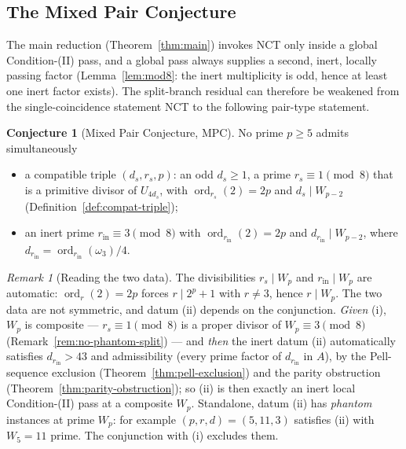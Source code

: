 \documentclass[11pt]{amsart}
\theoremstyle{plain}
\theoremstyle{definition}
\newtheorem{conjecture}[theorem]{Conjecture}
\theoremstyle{remark}
\newtheorem{remark}[theorem]{Remark}
\numberwithin{equation}{section}
\newcommand{\ord}{\operatorname{ord}}
\begin{document}
\subsection{The Mixed Pair Conjecture}\label{sec:mpc}

The main reduction (Theorem~\ref{thm:main}) invokes NCT only inside a global Condition-(II) pass, and a global pass always supplies a second, inert, locally passing factor (Lemma~\ref{lem:mod8}: the inert multiplicity is odd, hence at least one inert factor exists). The split-branch residual can therefore be weakened from the single-coincidence statement NCT to the following pair-type statement.

\begin{conjecture}[Mixed Pair Conjecture, MPC]\label{conj:mpc}
No prime $p \geq 5$ admits simultaneously
\begin{itemize}
\item[(i)] a compatible triple $(d_s, r_s, p)$: an odd $d_s \geq 1$, a prime $r_s \equiv 1 \pmod 8$ that is a primitive divisor of $U_{4 d_s}$, with $\ord_{r_s}(2) = 2p$ and $d_s \mid W_{p-2}$ (Definition~\ref{def:compat-triple});
\item[(ii)] an inert prime $r_{\mathrm{in}} \equiv 3 \pmod 8$ with $\ord_{r_{\mathrm{in}}}(2) = 2p$ and $d_{r_{\mathrm{in}}} \mid W_{p-2}$, where $d_{r_{\mathrm{in}}} = \ord_{r_{\mathrm{in}}}(\omega_3)/4$.
\end{itemize}
\end{conjecture}

\begin{remark}[Reading the two data]\label{rem:mpc-data}
The divisibilities $r_s \mid W_p$ and $r_{\mathrm{in}} \mid W_p$ are automatic: $\ord_r(2) = 2p$ forces $r \mid 2^p + 1$ with $r \neq 3$, hence $r \mid W_p$. The two data are not symmetric, and datum (ii) depends on the conjunction. \emph{Given} (i), $W_p$ is composite --- $r_s \equiv 1 \pmod 8$ is a proper divisor of $W_p \equiv 3 \pmod 8$ (Remark~\ref{rem:no-phantom-split}) --- and \emph{then} the inert datum (ii) automatically satisfies $d_{r_{\mathrm{in}}} > 43$ and admissibility (every prime factor of $d_{r_{\mathrm{in}}}$ in $A$), by the Pell-sequence exclusion (Theorem~\ref{thm:pell-exclusion}) and the parity obstruction (Theorem~\ref{thm:parity-obstruction}); so (ii) is then exactly an inert local Condition-(II) pass at a composite $W_p$. Standalone, datum (ii) has \emph{phantom} instances at prime $W_p$: for example $(p, r, d) = (5, 11, 3)$ satisfies (ii) with $W_5 = 11$ prime. The conjunction with (i) excludes them.
\end{remark}
\end{document}
